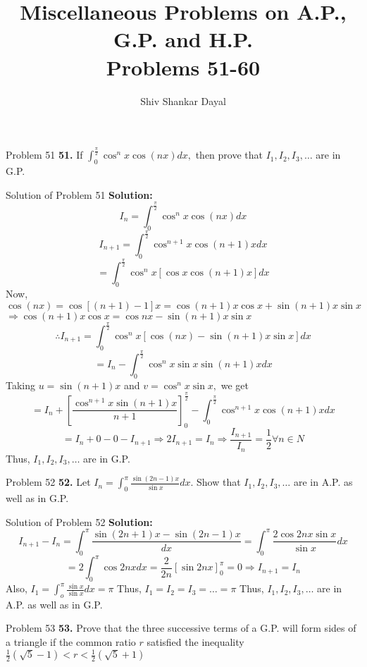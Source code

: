 \documentclass[aspectratio=1610,8pt]{beamer}
\title{Miscellaneous Problems on A.P., G.P. and H.P.\\Problems 51-60}
\author[Shiv Shankar Dayal]{Shiv Shankar Dayal}
\begin{document}
\begin{frame}
  \titlepage
\end{frame}
\begin{frame}{Problem 51}
  \textbf{51.} If $\int_0^{\frac{\pi}{2}}\cos^nx\cos(nx)dx,$ then prove that $I_1, I_2, I_3, \ldots$ are in G.P.
\end{frame}
\begin{frame}{Solution of Problem 51}
  \textbf{Solution:} $$I_n = \int_0^{\frac{\pi}{2}}\cos^nx\cos(nx)dx$$
  $$I_{n + 1} = \int_0^{\frac{\pi}{2}}\cos^{n + 1}x\cos(n + 1)xdx$$
  $$= \int_0^{\frac{\pi}{2}}\cos^{n}x[\cos x\cos (n + 1)x]dx$$
  Now, $\cos(nx) = \cos[(n + 1) - 1]x = \cos(n + 1)x\cos x + \sin(n + 1)x\sin x$
  $\Rightarrow \cos(n + 1)x\cos x = \cos nx - \sin(n + 1)x\sin x$
  $$\therefore I_{n + 1} = \int_0^{\frac{\pi}{2}}\cos^nx[\cos(nx) - \sin(n + 1)x\sin x]dx$$
  $$= I_n - \int_0^{\frac{\pi}{2}}\cos^nx \sin x\sin(n + 1)xdx$$
  Taking $u = \sin(n + 1)x$ and $v = \cos^nx\sin x,$ we get
  $$= I_n + \left[\frac{\cos^{n + 1}x\sin(n + 1)x}{n + 1}\right]_0^{\frac{\pi}{2}} - \int_0^{\frac{\pi}{2}}\cos^{n + 1}x\cos(n + 1)xdx$$
  $$= I_n + 0 - 0 - I_{n + 1} \Rightarrow 2I_{n + 1} = I_n\Rightarrow \frac{I_{n + 1}}{I_n} = \frac{1}{2}\forall n\in N$$
  Thus, $I_1, I_2, I_3, \ldots$ are in G.P.
\end{frame}
\begin{frame}{Problem 52}
  \textbf{52.} Let $I_n = \int_0^\pi \frac{\sin(2n - 1)x}{\sin x}dx.$ Show that $I_1, I_2, I_3, \ldots$ are in A.P. as well as in
  G.P.
\end{frame}
\begin{frame}{Solution of Problem 52}
  \textbf{Solution:} $$I_{n + 1} - I_{n} = \int_0^\pi \frac{\sin(2n + 1)x - \sin(2n - 1)x}{dx} = \int_0^\pi \frac{2\cos 2nx\sin
    x}{\sin x}dx$$
  $$= 2\int_0^\pi\cos 2nx dx = \frac{2}{2n}[\sin 2nx]_0^\pi = 0\Rightarrow I_{n + 1} = I_n$$
  Also, $I_1 = \int_o^\pi \frac{\sin x}{\sin x}dx = \pi$
  Thus, $I_1 = I_2 = I_3 = \ldots = \pi$
  Thus, $I_1, I_2, I_3, \ldots$ are in A.P. as well as in G.P.
\end{frame}
\begin{frame}{Problem 53}
  \textbf{53.} Prove that the three successive terms of a G.P. will form sides of a triangle if the common ratio $r$ satisfied the
  inequality $\frac{1}{2}(\sqrt{5} - 1) < r < \frac{1}{2}(\sqrt{5} + 1)$
\end{frame}
\end{document}
